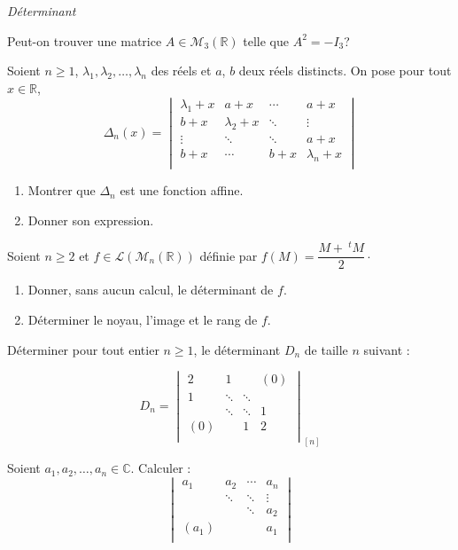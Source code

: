 \documentclass[a4paper,10pt]{report}
\begin{document}
\medskip

\begin{center}
\textit{{ {\large Déterminant}}}
\end{center}

\medskip


\begin{Exa} Peut-on trouver une matrice $A \in \mathcal{M}_3(\mathbb{R})$ telle que $A^2= - I_3$?
\end{Exa}

\begin{Exa} Soient $n \geq 1$, $\lambda_1 ,\lambda_2 ,\ldots,\lambda_n$ des réels et $a$, $b$ deux réels distincts. On pose pour tout $x \in \mathbb{R}$,
    \[
    \Delta_n(x) =
    \begin{vmatrix}
        {\lambda_1 + x} & {a + x} & \cdots & {a + x} \\
        {b + x} & {\lambda_2 + x} & \ddots & \vdots \\
        \vdots & \ddots & \ddots & {a + x} \\
        {b + x} & \cdots & {b + x} & {\lambda_n + x} \\
    \end{vmatrix}    
    \]
    \begin{enumerate}
      \item Montrer que $\Delta_n$ est une fonction affine.
      \item Donner son expression.
    \end{enumerate}
\end{Exa}


\begin{Exa} Soient $n \geq 2$ et $f \in \mathcal{L}(\mathcal{M}_n(\mathbb{R}))$ définie par $f(M) = \dfrac{M+~^tM}{2}\cdot$

\begin{enumerate}
\item Donner, sans aucun calcul, le déterminant de $f$.
\item Déterminer le noyau, l'image et le rang de $f$. 
\end{enumerate}
\end{Exa}


\begin{Exa} Déterminer pour tout entier $n \geq 1$, le déterminant $D_n$ de taille $n$ suivant :

\[
    D_n =
    \begin{vmatrix}
        2 & 1 & {} & {(0)} \\
        1 & \ddots & \ddots & {} \\
        {} & \ddots & \ddots & 1 \\
        {(0)} & {} & 1 & 2 \\
    \end{vmatrix}_{[n]}
    \]
\end{Exa} 


\begin{Exa} Soient $a_1 ,a_2 , \ldots ,a_n \in \mathbb{C}$. Calculer :
    \[
    \begin{vmatrix}
        {a_1} & {a_2} & \cdots & {a_n} \\
        {} & \ddots & \ddots & \vdots \\
        {} & {} & \ddots & {a_2} \\
        {(a_1)} & {} & {} & {a_1} \\
    \end{vmatrix}
    \]
\end{Exa}
\end{document}
